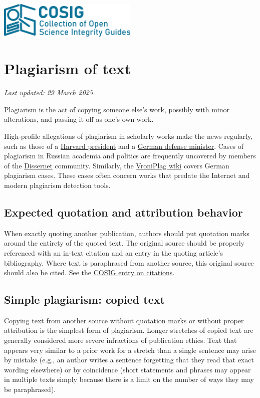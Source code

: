 \documentclass[letterpaper, 12pt]{article}
\begin{document}
\flushleft
\includegraphics[width=0.5\textwidth]{img/home/241017_final_logo_mockup.png}

\section*{Plagiarism of text}
\textit{Last updated: 29 March 2025}

Plagiarism is the act of copying someone else's work, possibly with minor alterations, and passing it off as one's own work.

High-profile allegations of plagiarism in scholarly works make the news regularly, such as those of a \href{https://www.theguardian.com/education/2024/jan/06/harvard-claudine-gay-plagiarism}{Harvard president} and a \href{https://www.bbc.com/news/world-europe-12504347}{German defense minister}. Cases of plagiarism in Russian academia and politics are frequently uncovered by members of the \href{https://dissernet.org/}{Dissernet} community. Similarly, the \href{https://vroniplag.fandom.com/de/wiki/Home}{VroniPlag wiki} covers German plagiarism cases. These cases often concern works that predate the Internet and modern plagiarism detection tools.

\subsection*{Expected quotation and attribution behavior}

When exactly quoting another publication, authors should put quotation marks around the entirety of the quoted text. The original source should be properly referenced with an in-text citation and an entry in the quoting article's bibliography. Where text is paraphrased from another source, this original source should also be cited. See the \href{https://osf.io/zpf4r}{COSIG entry on citations}.

\subsection*{Simple plagiarism: copied text}

Copying text from another source without quotation marks or without proper attribution is the simplest form of plagiarism. Longer stretches of copied text are generally considered more severe infractions of publication ethics. Text that appears very similar to a prior work for a stretch than a single sentence may arise by mistake (e.g., an author writes a sentence forgetting that they read that exact wording elsewhere) or by coincidence (short statements and phrases may appear in multiple texts simply because there is a limit on the number of ways they may be paraphrased).
\end{document}
